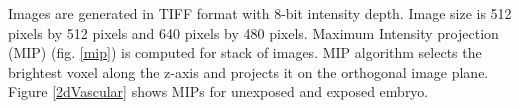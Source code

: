 Images are generated in TIFF format with 8-bit intensity depth. Image size is 512 pixels by 512 pixels and 640 pixels by 480 pixels. Maximum Intensity projection (MIP) (fig. \ref{mip}) is computed for stack of images. MIP algorithm selects the brightest voxel along the z-axis and projects it on the orthogonal image plane. Figure \ref{2dVascular} shows MIPs for unexposed and exposed embryo.